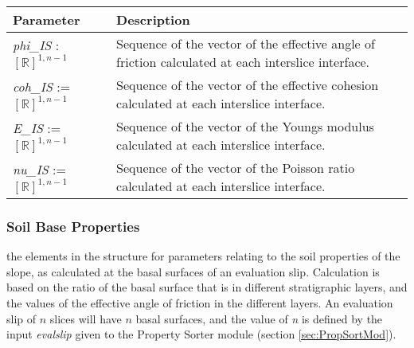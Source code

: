 \documentclass[12pt]{article}
\begin{document}
\begin{center}
\begin{longtable}{p{} p{}}
  \hline \textbf{Parameter} & \textbf{Description} \\ \hline
    
  \textit{phi\_IS} : $[\mathbb{R}]^{1,n-1}$ & Sequence of the vector
  of the effective angle of friction calculated at each interslice
  interface. \\

  \textit{coh\_IS} := $[\mathbb{R}]^{1,n-1}$ & Sequence of the vector
  of the effective cohesion calculated at each interslice interface.\\

  \textit{E\_IS} := $[\mathbb{R}]^{1,n-1}$ & Sequence of the vector of
  the Youngs modulus calculated at each interslice interface.\\

  \textit{nu\_IS} := $[\mathbb{R}]^{1,n-1}$ & Sequence of the vector
  of the Poisson ratio calculated at each interslice
  interface. \\ \hline
\end{longtable}
\end{center}

\subsubsection{Soil Base Properties} \label{Tbl:SoilBaseParam}
the elements in the structure for parameters relating to the soil
properties of the slope, as calculated at the basal surfaces of an
evaluation slip. Calculation is based on the ratio of the basal
surface that is in different stratigraphic layers, and the values of
the effective angle of friction in the different layers. An evaluation
slip of $n$ slices will have $n$ basal surfaces, and the value of
\textit{n} is defined by the input \textit{evalslip} given to
the Property Sorter module (section \ref{sec:PropSortMod}).
\end{document}
